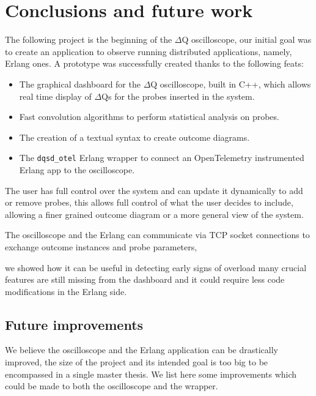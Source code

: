 \chapter{Conclusions and future work}
The following project is the beginning of the $\Delta$Q oscilloscope, our initial goal was to create an application to observe running distributed applications, namely, Erlang ones.
    A prototype was successfully created thanks to the following feats:
    \begin{itemize}
        \item The graphical dashboard for the $\Delta$Q oscilloscope, built in C++, which allows real time display of $\Delta$Qs for the probes inserted in the system.
        \item Fast convolution algorithms to perform statistical analysis on probes.
        \item The creation of a textual syntax to create outcome diagrams.
        \item The \texttt{dqsd\_otel} Erlang wrapper to connect an OpenTelemetry instrumented Erlang app to the oscilloscope.
    \end{itemize}
    The user has full control over the system and can update it dynamically to add or remove probes, this allows full control of what the user decides to include, allowing a finer grained outcome diagram or a more general view of the system.  

    The oscilloscope and the Erlang can communicate via TCP socket connections to exchange outcome instances and probe parameters,

    we showed how it can be useful in detecting early signs of overload many crucial features are still missing from the dashboard and it could require less code modifications in the Erlang side. 

    \section{Future improvements}
        We believe the oscilloscope and the Erlang application can be drastically improved, the size of the project and its intended goal is too big to be encompassed in a single master thesis. We list here some improvements which could be made to both the oscilloscope and the wrapper.

